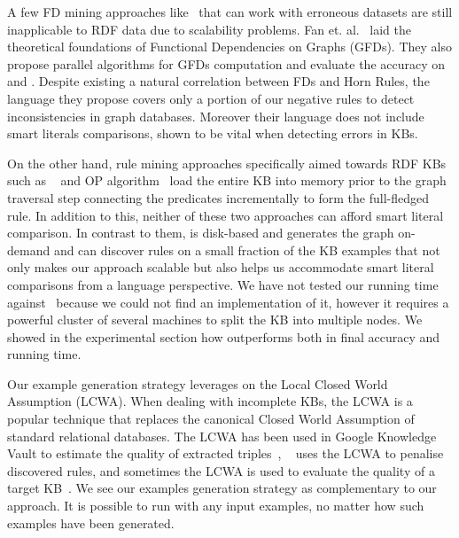 A few FD mining approaches like~\cite{abedjan2015temporal,kivinen1995approximate} that can work with erroneous datasets are still inapplicable to RDF data due to scalability problems.
Fan et. al.~\cite{FanFDGraphs} laid the theoretical foundations of Functional Dependencies on Graphs (GFDs). They also propose parallel algorithms for GFDs computation and evaluate the accuracy on \yago and \dbpedia. Despite existing a natural correlation between FDs and Horn Rules, the language they propose covers only a portion of our negative rules to detect inconsistencies in graph databases. Moreover their language does not include smart literals comparisons, shown to be vital when detecting errors in KBs.

On the other hand, rule mining approaches specifically aimed towards RDF KBs such as \amie~\cite{galarraga2015fast} and OP algorithm~\cite{Chen:2016} load the entire KB into memory prior to 
the graph traversal step connecting the predicates incrementally to form the full-fledged rule. In addition to this, neither of these two approaches can afford smart literal comparison. 
In contrast to them, \krd is disk-based and generates the graph on-demand and can discover rules on a small fraction of the KB examples that not only makes our approach scalable but also helps us 
accommodate smart literal comparisons from a language perspective. We have not tested our running time against~\cite{Chen:2016} because we could not find an implementation of it, 
however it requires a powerful cluster of several machines to split the KB into multiple nodes. 
We showed in the experimental section how \krd outperforms \amie both in final accuracy and running time.

Our example generation strategy leverages on the Local Closed World Assumption (LCWA). When dealing with incomplete KBs, the LCWA is a popular technique that replaces the canonical Closed World Assumption of standard relational databases. The LCWA has been used in Google Knowledge Vault to estimate the quality of extracted triples~\cite{dong2014data,dong2014knowledge}, \amie~\cite{galarraga2015fast} uses the LCWA to penalise discovered rules, and sometimes the LCWA is used to evaluate the quality of a target KB~\cite{dong2015knowledge}. We see our examples generation strategy as complementary to our approach. It is possible to run \krd with any input examples, no matter how such examples have been generated.

